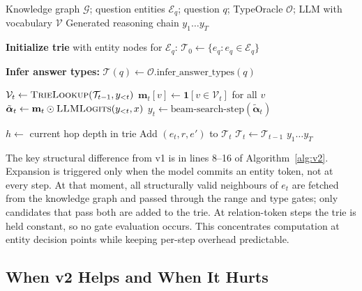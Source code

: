 \begin{algorithm}[H]
  \caption{DCA-Trie v2: Step-Wise Symbolic Expansion}
  \label{alg:v2}
  \small
  \begin{algorithmic}[1]
    \Require Knowledge graph $\mathcal{G}$; question entities $\mathcal{E}_q$;
    question $q$; TypeOracle $\mathcal{O}$; LLM with vocabulary $\mathcal{V}$
    \Ensure Generated reasoning chain $y_1 \ldots y_T$

    \State \textbf{Initialize trie} with entity nodes for $\mathcal{E}_q$:
    $\mathcal{T}_0 \gets \{e_q : e_q \in \mathcal{E}_q\}$

    \State \textbf{Infer answer types:}
    $\mathcal{T}(q) \gets \mathcal{O}.\text{infer\_answer\_types}(q)$

    \State $\mathcal{V}_t \gets \textsc{TrieLookup}(\mathcal{T}_{t-1}, y_{<t})$
    \State $\mathbf{m}_t[v] \gets \mathbf{1}[v \in \mathcal{V}_t]$ for all $v$
    \State $\tilde{\boldsymbol{\alpha}}_t \gets \mathbf{m}_t \odot
      \textsc{LLMLogits}(y_{<t}, x)$
    \State $y_t \gets \text{beam-search-step}(\tilde{\boldsymbol{\alpha}}_t)$

    \State $h \gets$ current hop depth in trie
    \State Add $(e_t, r, e')$ to $\mathcal{T}_t$
    \EndIf
    \EndIf
    \EndFor
    \Else
    \State $\mathcal{T}_t \gets \mathcal{T}_{t-1}$
    \EndIf
    \EndFor
    \State \Return $y_1 \ldots y_T$
  \end{algorithmic}
\end{algorithm}

The key structural difference from v1 is in lines 8--16 of Algorithm~\ref{alg:v2}. Expansion is triggered only when the model commits an entity token, not at every step. At that moment, all structurally valid neighbours of $e_t$ are fetched from the knowledge graph and passed through the range and type gates; only candidates that pass both are added to the trie. At relation-token steps the trie is held constant, so no gate evaluation occurs. This concentrates computation at entity decision points while keeping per-step overhead predictable.

\subsection{When v2 Helps and When It Hurts}
\label{sec:ch3v2behavior}

